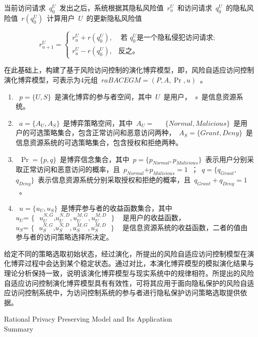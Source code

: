 \documentclass[pdftex,notypeinfo,twoside,openany,UTF8,fntef]{CASthesis}
\theoremstyle{THrm}{
	\newtheorem{question}{Question}[section]
	\newtheorem{property}{性质}[section]
	\newtheorem{assumption}{假设}[section]
	\newtheorem{claim}[lemma]{断言}
	
}
\begin{document}
当前访问请求~$q_{0}^{U}$~发出之后，系统根据其隐私风险值~$r_{n}^{U}$~和访问请求~$q_{0}^{U}$~的隐私风险值~$r(q_{0}^{U})$~计算用户~$U$~的更新隐私风险值

\begin{equation}\label{eq:users-risk}
r_{n+1}^{U}=\begin{cases}
r_{n}^{U}+r(q_0^U), & \text{ 若 } q_0^U \text{是一个隐私侵犯访问请求}; \\ 
r_{n}^{U}-r(q_0^U),& \text{反之。}
\end{cases}
\end{equation}

在此基础上，构建了基于风险访问控制的演化博弈模型，即，风险自适应访问控制演化博弈模型，可表示为4元组~$raBACEGM=(P,A,\Pr ,u)$~。
\begin{enumerate}
	\item ~$p=\{U,S\}$~是演化博弈的参与者空间，其中~$U$~是用户，~$s$~是信息资源系统。
	\item ~$a=\{{{A}_{U}},{{A}_{S}}\}$~是博弈策略空间，其中~${{A}_{U}}=~$~ ~$\{Normal,Malicious\}$~是用户的可选策略集合，包含正常访问和恶意访问两种，~${{A}_{S}}=\{Grant,Deny\}$~是信息资源系统的可选策略集合，包含授权和拒绝两种。
	\item ~$\Pr =\{p,q\}$~是博弈信念集合，其中~$p=\{{{p}_{Normal}},{{p}_{Malicious}}\}$~表示用户分别采取正常访问和恶意访问的概率，且~${{p}_{Normal}}\text{+}{{p}_{Malicious}}=1$~；~$q=\{{{q}_{Grant}},~$~ ~${{q}_{Deny}}\}$~表示信息资源系统分别采取授权和拒绝的概率，且~${{q}_{Grant}}+{{q}_{Deny}}=1$~。
	\item ~$u=\{{{u}_{U}},{{u}_{S}}\}$~是博弈参与者的收益函数集合，其中~${{u}_{U}}\text{= }\!\!\{\!\!\text{ }u_{U}^{N,G}\text{,}u_{U}^{N,D},u_{U}^{M,G},u_{U}^{M,D}\text{ }\!\!\}\!\!\text{ }$~是用户的收益函数，~${{u}_{S}}\text{= }\!\!\{\!\!\text{ }u_{S}^{N,G}\text{,}u_{S}^{N,D},u_{S}^{M,G},u_{S}^{M,D}\text{ }\!\!\}\!\!\text{ }$~是信息资源系统的收益函数，二者的值由参与者的访问策略选择所决定。
\end{enumerate}

给定不同的策略选取初始状态，经过演化，所提出的风险自适应访问控制模型在演化博弈过程中会达到某个稳定状态。通过对比，本演化博弈模型的模拟演化结果与理论分析保持一致，说明该演化博弈模型与现实系统中的规律相符。所提出的风险自适应访问控制演化博弈模型具有有效性，可将其应用于面向隐私保护的风险自适应访问控制系统中，为访问控制系统的参与者进行隐私保护访问策略选取提供依据。



\newpage
  \begin{center}
	\heiti{}
	{Rational Privacy Preserving Model and Its Application}\\
	\heiti{}
	{Summary}
\end{center}
\end{document}
